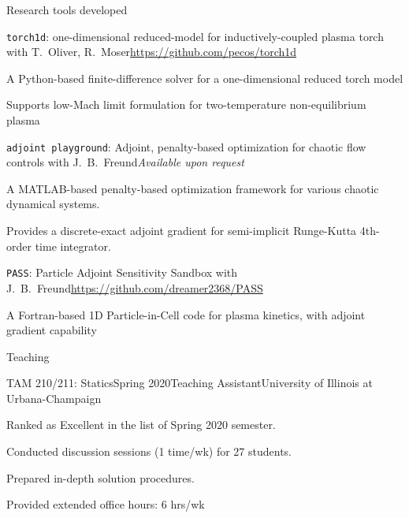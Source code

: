 \documentclass{resume} %
\begin{document}
\begin{rSection}{Research tools developed}
\begin{rSubsection}{\texttt{torch1d}: one-dimensional reduced-model for inductively-coupled plasma torch}{}
{with T.\ Oliver, R.\ Moser}{\url{https://github.com/pecos/torch1d}}
\item A Python-based finite-difference solver for a one-dimensional reduced torch model
\item Supports low-Mach limit formulation for two-temperature non-equilibrium plasma
\end{rSubsection}
\begin{rSubsection}{\texttt{adjoint playground}: Adjoint, penalty-based optimization for chaotic flow controls}{}
{with J.\ B.\ Freund}{\em Available upon request}
\item A MATLAB-based penalty-based optimization framework for various chaotic dynamical systems.
\item Provides a discrete-exact adjoint gradient for semi-implicit Runge-Kutta 4th-order time integrator.
\end{rSubsection}
\begin{rSubsection}{\texttt{PASS}: Particle Adjoint Sensitivity Sandbox}{}
{with J.\ B.\ Freund}{\url{https://github.com/dreamer2368/PASS}}
\item A Fortran-based 1D Particle-in-Cell code for plasma kinetics, with adjoint gradient capability
\end{rSubsection}
\end{rSection}


\begin{rSection}{Teaching}


\begin{rSubsection}{TAM 210/211: Statics}{Spring 2020}{Teaching Assistant}{University of Illinois at Urbana-Champaign}
\item Ranked as Excellent in the list of Spring 2020 semester.
\item Conducted discussion sessions (1 time/wk) for 27 students.
\item Prepared in-depth solution procedures.
\item Provided extended office hours: 6 hrs/wk
\end{rSubsection}


\end{rSection}
\end{document}
